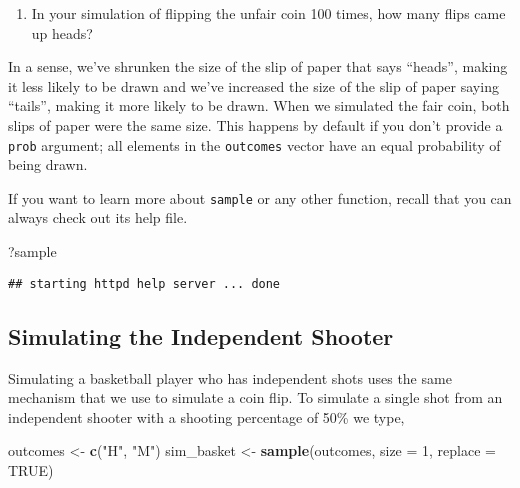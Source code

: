 \documentclass[
]{article}
\newenvironment{Shaded}{\begin{snugshade}}{\end{snugshade}}
\newcommand{\DataTypeTok}[1]{\textcolor[rgb]{0.13,0.29,0.53}{#1}}
\newcommand{\DecValTok}[1]{\textcolor[rgb]{0.00,0.00,0.81}{#1}}
\newcommand{\KeywordTok}[1]{\textcolor[rgb]{0.13,0.29,0.53}{\textbf{#1}}}
\newcommand{\NormalTok}[1]{#1}
\newcommand{\OtherTok}[1]{\textcolor[rgb]{0.56,0.35,0.01}{#1}}
\newcommand{\StringTok}[1]{\textcolor[rgb]{0.31,0.60,0.02}{#1}}
\providecommand{\tightlist}{%
  \setlength{\itemsep}{0pt}\setlength{\parskip}{0pt}}
\begin{document}
\begin{enumerate}
\def\labelenumi{\arabic{enumi}.}
\setcounter{enumi}{2}
\tightlist
\item
  In your simulation of flipping the unfair coin 100 times, how many
  flips came up heads?
\end{enumerate}

In a sense, we've shrunken the size of the slip of paper that says
``heads'', making it less likely to be drawn and we've increased the
size of the slip of paper saying ``tails'', making it more likely to be
drawn. When we simulated the fair coin, both slips of paper were the
same size. This happens by default if you don't provide a \texttt{prob}
argument; all elements in the \texttt{outcomes} vector have an equal
probability of being drawn.

If you want to learn more about \texttt{sample} or any other function,
recall that you can always check out its help file.

\begin{Shaded}
\begin{Highlighting}[]
\NormalTok{?sample}
\end{Highlighting}
\end{Shaded}

\begin{verbatim}
## starting httpd help server ... done
\end{verbatim}

\hypertarget{simulating-the-independent-shooter}{%
\subsection{Simulating the Independent
Shooter}\label{simulating-the-independent-shooter}}

Simulating a basketball player who has independent shots uses the same
mechanism that we use to simulate a coin flip. To simulate a single shot
from an independent shooter with a shooting percentage of 50\% we type,

\begin{Shaded}
\begin{Highlighting}[]
\NormalTok{outcomes <-}\StringTok{ }\KeywordTok{c}\NormalTok{(}\StringTok{"H"}\NormalTok{, }\StringTok{"M"}\NormalTok{)}
\NormalTok{sim_basket <-}\StringTok{ }\KeywordTok{sample}\NormalTok{(outcomes, }\DataTypeTok{size =} \DecValTok{1}\NormalTok{, }\DataTypeTok{replace =} \OtherTok{TRUE}\NormalTok{)}
\end{Highlighting}
\end{Shaded}
\end{document}
